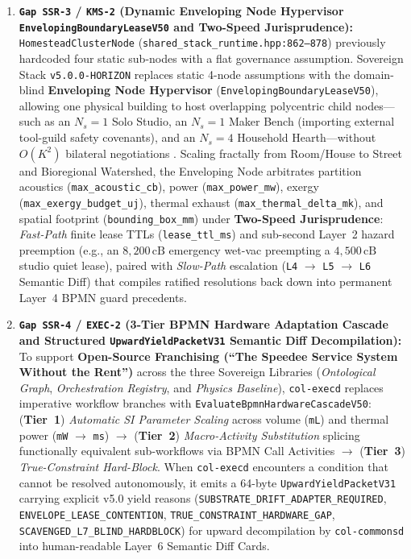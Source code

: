 \begin{enumerate}
  \item \textbf{\texttt{Gap SSR-3} / \texttt{KMS-2} (Dynamic Enveloping Node Hypervisor \texttt{EnvelopingBoundaryLeaseV50} and Two-Speed Jurisprudence):}
  \texttt{HomesteadClusterNode} (\texttt{shared\_stack\_runtime.hpp:862--878}) previously hardcoded four static sub-nodes with a flat governance assumption. Sovereign Stack \texttt{v5.0.0-HORIZON} replaces static 4-node assumptions with the domain-blind \textbf{Enveloping Node Hypervisor} (\texttt{EnvelopingBoundaryLeaseV50}), allowing one physical building to host overlapping polycentric child nodes---such as an $N_s=1$ Solo Studio, an $N_s=1$ Maker Bench (importing external tool-guild safety covenants), and an $N_s=4$ Household Hearth---without $O(K^2)$ bilateral negotiations \parencite{ostrom2010}. Scaling fractally from Room/House to Street and Bioregional Watershed, the Enveloping Node arbitrates partition acoustics (\texttt{max\_acoustic\_cb}), power (\texttt{max\_power\_mw}), exergy (\texttt{max\_exergy\_budget\_uj}), thermal exhaust (\texttt{max\_thermal\_delta\_mk}), and spatial footprint (\texttt{bounding\_box\_mm}) under \textbf{Two-Speed Jurisprudence}: \emph{Fast-Path} finite lease TTLs (\texttt{lease\_ttl\_ms}) and sub-second Layer~2 hazard preemption (e.g., an $8{,}200\,\mathrm{cB}$ emergency wet-vac preempting a $4{,}500\,\mathrm{cB}$ studio quiet lease), paired with \emph{Slow-Path} escalation (\texttt{L4} $\to$ \texttt{L5} $\to$ \texttt{L6} Semantic Diff) that compiles ratified resolutions back down into permanent Layer~4 BPMN guard precedents.

  \item \textbf{\texttt{Gap SSR-4} / \texttt{EXEC-2} (3-Tier BPMN Hardware Adaptation Cascade and Structured \texttt{UpwardYieldPacketV31} Semantic Diff Decompilation):}
  To support \textbf{Open-Source Franchising (``The Speedee Service System Without the Rent'')} across the three Sovereign Libraries (\emph{Ontological Graph}, \emph{Orchestration Registry}, and \emph{Physics Baseline}), \texttt{col-execd} replaces imperative workflow branches with \texttt{EvaluateBpmnHardwareCascadeV50}: (\textbf{Tier~1}) \emph{Automatic SI Parameter Scaling} across volume (\texttt{mL}) and thermal power (\texttt{mW} $\to$ \texttt{ms}) $\to$ (\textbf{Tier~2}) \emph{Macro-Activity Substitution} splicing functionally equivalent sub-workflows via BPMN Call Activities $\to$ (\textbf{Tier~3}) \emph{True-Constraint Hard-Block}. When \texttt{col-execd} encounters a condition that cannot be resolved autonomously, it emits a 64-byte \texttt{UpwardYieldPacketV31} carrying explicit v5.0 yield reasons (\texttt{SUBSTRATE\_DRIFT\_ADAPTER\_REQUIRED}, \texttt{ENVELOPE\_LEASE\_CONTENTION}, \texttt{TRUE\_CONSTRAINT\_HARDWARE\_GAP}, \texttt{SCAVENGED\_L7\_BLIND\_HARDBLOCK}) for upward decompilation by \texttt{col-commonsd} into human-readable Layer~6 Semantic Diff Cards.


\end{enumerate}
